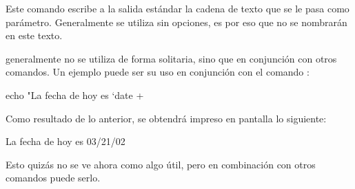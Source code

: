 \autor{\LDP}
\colaborador{}
\revisor{\LLC}
\traductor{}

Este comando escribe a la salida est\'andar la cadena de texto que se
le pasa como par\'ametro. Generalmente se utiliza sin opciones, es por
eso que no se nombrar\'an en este texto.

\begin{ejemplo}

 generalmente no se utiliza de forma solitaria, sino que en
conjunci\'on con otros comandos. Un ejemplo puede ser su uso en
conjunci\'on con el comando :

\begin{vscreen}
echo "La fecha de hoy es `date +%
\end{vscreen}

Como resultado de lo anterior, se obtendr\'a impreso en pantalla lo
siguiente:

\begin{vscreen}
La fecha de hoy es 03/21/02
\end{vscreen}

Esto quiz\'as no se ve ahora como algo \'util, pero en combinaci\'on
con otros comandos puede serlo.

\end{ejemplo}

